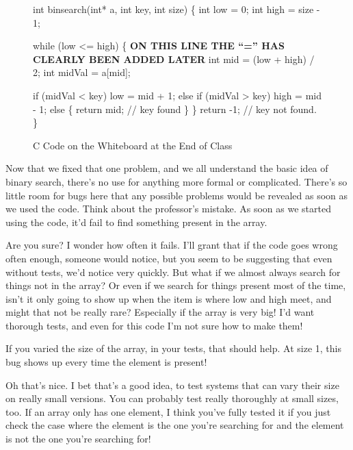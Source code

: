 \documentclass[sigplan]{acmart}
\begin{document}
\vspace{0.1in}

\begin{figure*}
  {\scriptsize
  \begin{code}
int binsearch(int* a, int key, int size) \{
  int low = 0;
  int high = size - 1;
  
  while (low <= high) \{ {\bf ON THIS LINE THE ``='' HAS CLEARLY BEEN ADDED LATER}
    int mid = (low + high) / 2;
    int midVal = a[mid];

    if (midVal < key)
      low = mid + 1;
    else if (midVal > key)
      high = mid - 1;
    else \{
      return mid; // key found
    \}
  \}
  return -1;  // key not found.
\}
\end{code}
}
\caption{C Code on the Whiteboard at the End of Class}
\label{fig:first}
\end{figure*}


  Now that we fixed that one problem, and
we all understand the basic idea of binary search, there's no use for
anything more formal or complicated.  There's so little room for bugs
here that any possible problems would be revealed as soon as we used
the code.  Think about the professor's mistake.  As soon as we started
using the code, it'd fail to find something present in the array.

 Are you sure?  I wonder how often it
fails.  I'll grant that if the code goes wrong often enough, someone
would notice, but you seem to be suggesting that even without tests,
we'd notice very quickly.  But what if we almost always search for
things not in the array?  Or even if we search for things present most
of the time, isn't it only going to show up when the item is where low
and high meet, and might that not be really rare?  Especially if the
array is very big!  I'd want thorough tests, and even for this code
I'm not sure how to make them!

 If you varied the size of the array, in
your tests, that should help.  At size 1, this bug shows up every time
the element is present!

  Oh that's nice.  I bet that's a good
idea, to test systems that can vary their size on really small
versions.  You can probably test really thoroughly at small sizes,
too.  If an array only has one element, I think you've fully tested it
if you just check the case where the element is the one you're
searching for and the element is not the one you're searching for!
\end{document}
